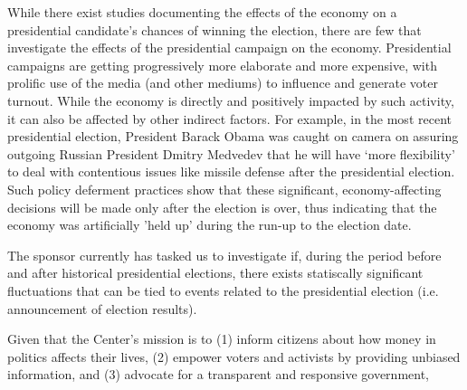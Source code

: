 

While there exist studies documenting the effects of the economy on a presidential candidate's chances of winning the election, there are few that investigate the effects of the presidential campaign on the economy.  Presidential campaigns are getting progressively more elaborate and more expensive, with prolific use of the media (and other mediums) to influence and generate voter turnout. While the economy is directly and positively impacted  by such activity, it can also be affected by other indirect factors. For example, in the most recent presidential election, President Barack Obama was caught on camera on assuring outgoing Russian President Dmitry Medvedev that he will have `more flexibility' to deal with contentious issues like missile defense after the presidential election. Such policy deferment practices show that these significant, economy-affecting decisions will be made only after the election is over, thus indicating that the economy was artificially 'held up' during the run-up to the election date.

The sponsor currently has tasked us to investigate if, during the period before and after historical presidential elections, there exists statiscally significant fluctuations that can be tied to events related to the presidential election (i.e. announcement of election results). 

Given that the Center's mission is to (1) inform citizens about how money in politics affects their lives, (2) empower voters and activists by providing unbiased information, and (3) advocate for a transparent and responsive government, 